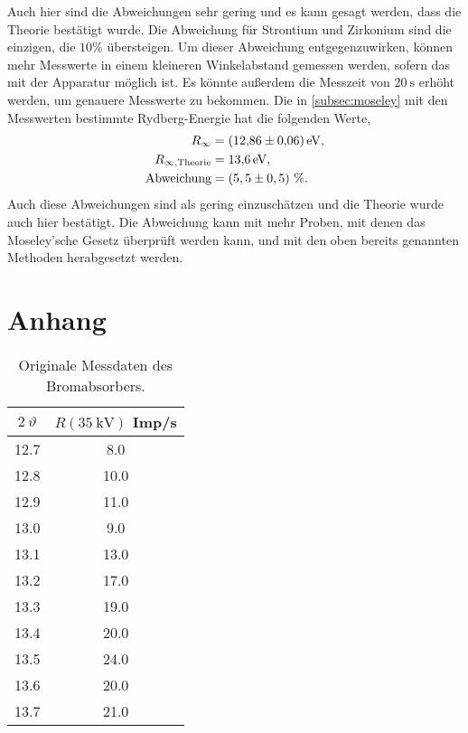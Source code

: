 Auch hier sind die Abweichungen sehr gering und es kann gesagt werden, dass die Theorie bestätigt wurde. Die Abweichung für Strontium und Zirkonium sind die einzigen, die $10 \%$ übersteigen. Um
dieser Abweichung entgegenzuwirken, können mehr Messwerte in einem kleineren Winkelabstand gemessen werden, sofern das mit der Apparatur möglich ist. Es könnte außerdem die
Messzeit von $\SI{20}{\second}$ erhöht werden, um genauere Messwerte zu bekommen.\newline
Die in \autoref{subsec:moseley} mit den Messwerten bestimmte Rydberg-Energie hat die folgenden Werte,
\begin{align*}
    R_\infty &= \SI{12,86(0,06)}{\eV}, \\
    R_{\infty, \text{Theorie}} &= \SI{13,6}{\eV}, \\
    \text{Abweichung} &= (5,5 \pm 0,5) ~\%.
\end{align*}
Auch diese Abweichungen sind als gering einzuschätzen und die Theorie wurde auch hier bestätigt. Die Abweichung kann mit mehr Proben, mit denen das Moseley'sche Gesetz
überprüft werden kann, und mit den oben bereits genannten Methoden herabgesetzt werden.

\printbibliography{}

\section*{Anhang}
\label{sec:anhang}

\begin{table}[H]
    \caption{Originale Messdaten des Bromabsorbers.}
    \centering
    \label{tab:origDaten2}
    \begin{tabular}{c c}
        \toprule
        $2~\vartheta$ & $R(\SI{35}{\kilo\volt})$ Imp/s \\
        \midrule
        12.7  &  8.0  \\
        12.8  &  10.0  \\
        12.9  &  11.0  \\
        13.0  &  9.0  \\
        13.1  &  13.0  \\
        13.2  &  17.0  \\
        13.3  &  19.0  \\
        13.4  &  20.0  \\
        13.5  &  24.0  \\
        13.6  &  20.0  \\
        13.7  &  21.0  \\
        \bottomrule
    \end{tabular}
\end{table}

